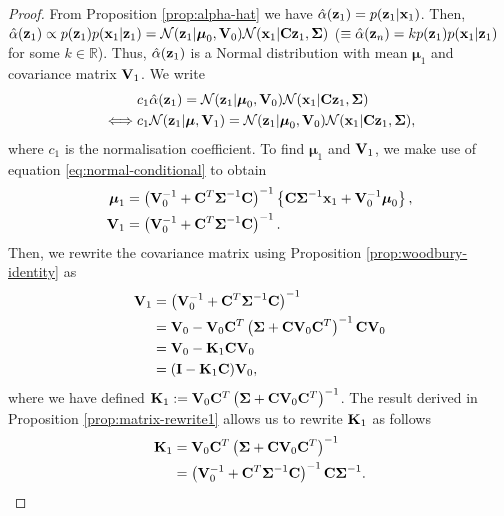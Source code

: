 \documentclass[12pt, oneside]{book}
\numberwithin{equation}{section}
\newcommand{\x}{{\bf x}}
\newcommand{\z}{{\bf z}}
\newcommand{\N}{\mathcal{N}}
\newcommand{\R}{\mathbb{R}}
\begin{document}
{\begin{proof}
	From Proposition \ref{prop:alpha-hat} we have $\hat\alpha(\z_1) = p(\z_1\vert\x_1)$. Then, $\hat\alpha(\z_1) \propto p(\z_1)p(\x_1\vert\z_1) = \N(\z_1 \vert \boldsymbol\mu_0, {\bf V}_0) \N(\x_1\vert {\bf C}\z_1, \boldsymbol\Sigma)$ ($\equiv \hat{\alpha}(\z_n) = k p(\z_1)p(\x_1\vert\z_1)$ for some $k \in \R$). Thus, $\hat\alpha(\z_1)$ is a Normal distribution with mean $\boldsymbol{\mu}_1$ and covariance matrix ${\bf V}_1$. We write
	\begin{align}
		&c_1 \hat\alpha(\z_1) = \N(\z_1 \vert \boldsymbol\mu_0, {\bf V}_0) \N(\x_1\vert {\bf C}\z_1, \boldsymbol\Sigma)\\
		\iff& c_1 \N(\z_1\vert \boldsymbol\mu, {\bf V}_1) = \N(\z_1 \vert \boldsymbol\mu_0, {\bf V}_0) \N(\x_1\vert {\bf C}\z_1, \boldsymbol\Sigma),
	\end{align}
	where $c_1$ is the normalisation coefficient. To find $\boldsymbol{\mu}_1$ and ${\bf V}_1$, we make use of equation \eqref{eq:normal-conditional} to obtain
	\begin{align}
		\boldsymbol{\mu}_1 &= \left({\bf V}_0^{-1} + {\bf C}^T\boldsymbol{\Sigma}^{-1} {\bf C}\right)^{-1} \left\{{\bf C}\boldsymbol\Sigma^{-1}\x_1 + {\bf V}_0^{-1}\boldsymbol\mu_0\right\},\\
		{\bf V}_1 &= \left({\bf V}_0^{-1} + {\bf C}^T\boldsymbol{\Sigma}^{-1} {\bf C}\right)^{-1}.
	\end{align}
	Then, we rewrite the covariance matrix using Proposition \ref{prop:woodbury-identity} as
	\begin{align}
		{\bf V}_1 &= \left({\bf V}_0^{-1} + {\bf C}^T\boldsymbol{\Sigma}^{-1} {\bf C}\right)^{-1}\\
		&= {\bf V}_0 - {\bf V}_0 {\bf C}^T\left(\boldsymbol\Sigma + {\bf C}{\bf V}_0{\bf C}^T\right)^{-1}{\bf C}{\bf V}_0 \\
		&= {\bf V}_0 - {\bf K}_1{\bf C}{\bf V}_0\\
		&= ({\bf I} - {\bf K}_1{\bf C}){\bf V}_0, \label{eq:part-v1-rewrite}
	\end{align}
	where we have defined ${\bf K}_1 := {\bf V}_0 {\bf C}^T\left(\boldsymbol\Sigma + {\bf C}{\bf V}_0{\bf C}^T\right)^{-1}$. The result derived in Proposition \ref{prop:matrix-rewrite1} allows us to rewrite ${\bf K}_1$ as follows
	\begin{align}
		{\bf K}_1 &= {\bf V}_0 {\bf C}^T\left(\boldsymbol\Sigma + {\bf C}{\bf V}_0{\bf C}^T\right)^{-1}\\
				  &= \left({\bf V}_0^{-1} + {\bf C}^T \boldsymbol\Sigma^{-1}{\bf C}\right)^{-1}{\bf C}\boldsymbol{\Sigma}^{-1}. \label{eq:part-k1-rewrite}

\end{align}
\end{proof}}
\end{document}

